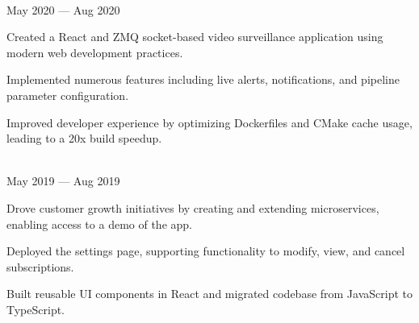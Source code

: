  \hfill {} \\
 \hfill May 2020 — Aug 2020 \\ 
\begin{tightemize}
  \item Created a React and ZMQ socket-based video surveillance application using modern web development practices.
  \item Implemented numerous features including live alerts, notifications, and pipeline parameter configuration.
  \item Improved developer experience by optimizing Dockerfiles and CMake cache usage, leading to a 20x build speedup.
\end{tightemize}
\vspace{0.2em}

 \hfill {} \\
 \hfill May 2019 — Aug 2019 \\ 
\begin{tightemize}
  \item Drove customer growth initiatives by creating and extending microservices, enabling access to a demo of the app.
  \item Deployed the settings page, supporting functionality to modify, view, and cancel subscriptions.
  \item Built reusable UI components in React and migrated codebase from JavaScript to TypeScript.
\end{tightemize}
